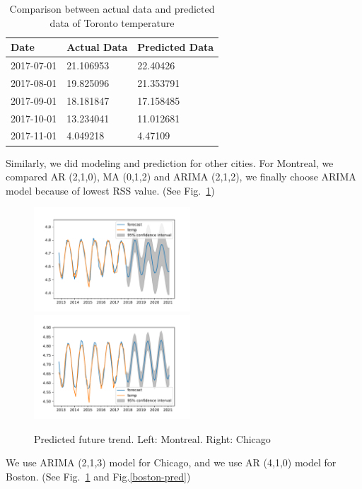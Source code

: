 \documentclass[runningheads]{llncs}
\begin{document}
\begin{table}
    \centering
    \caption{Comparison between actual data and predicted data of Toronto temperature}\label{toronto-pred-compare}
    \begin{tabular}{l|l|l}
    \hline
    Date&	Actual Data&	Predicted Data\\ \hline
    2017-07-01&	21.106953&	22.40426\\ \hline
    2017-08-01&	19.825096&	21.353791\\ \hline
    2017-09-01&	18.181847&	17.158485\\ \hline
    2017-10-01&	13.234041&	11.012681\\ \hline
    2017-11-01&	4.049218&	4.47109\\ \hline
    \end{tabular}
\end{table}

Similarly, we did modeling and prediction for other cities. For Montreal, we compared AR (2,1,0), MA (0,1,2) and ARIMA (2,1,2), we finally choose ARIMA model because of lowest RSS value. (See Fig.~\ref{montreal-chicago-pred})

\begin{figure}
    \centering
    \includegraphics[width=2.3in]{Montreal-pred.pdf}
    \includegraphics[width=2.3in]{Chicago-pred.pdf}
    \caption{Predicted future trend. Left: Montreal. Right: Chicago}\label{montreal-chicago-pred}
\end{figure}

We use ARIMA (2,1,3) model for Chicago, and we use AR (4,1,0) model for Boston. (See Fig.~\ref{montreal-chicago-pred} and Fig.\ref{boston-pred})
\end{document}
